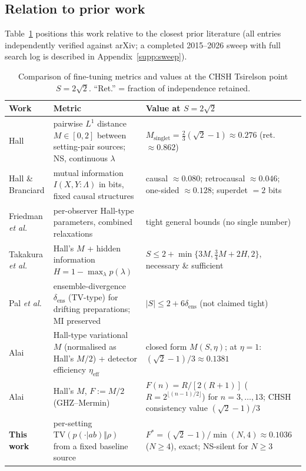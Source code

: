 \documentclass[aps,pra,reprint,superscriptaddress,floatfix]{revtex4-2}
\newcommand{\TV}{\mathrm{TV}}
\begin{document}
\subsection{Relation to prior work}
\label{sec:related}

Table~\ref{tab:lit} positions this work relative to the closest prior
literature (all entries independently verified against arXiv; a completed
2015--2026 sweep with full search log is described in Appendix~\ref{supp:sweep}).

\begin{table}[!htbp]
\caption{Comparison of fine-tuning metrics and values at the CHSH Tsirelson
point $S=2\sqrt2$. ``Ret.'' = fraction of independence retained.}
\label{tab:lit}
\small
\begin{tabular}{@{}>{\raggedright\arraybackslash}p{2.6cm}>{\raggedright\arraybackslash}p{2.9cm}>{\raggedright\arraybackslash}p{2.8cm}@{}}
\toprule
Work & Metric & Value at $S=2\sqrt2$ \\ \midrule
Hall \cite{hall2010}
& pairwise $L^1$ distance $M\in[0,2]$ between setting-pair sources; NS, continuous $\lambda$
& $M_{\mathrm{singlet}}=\tfrac{2}{3}(\sqrt2-1)\approx0.276$ (ret.\ $\approx0.862$) \\ \addlinespace
Hall \& Branciard \cite{hallbranciard2020}
& mutual information $I(X,Y:\Lambda)$ in bits, fixed causal structures
& causal $\approx0.080$; retrocausal $\approx0.046$; one-sided $\approx0.128$; superdet $=2$ bits \\ \addlinespace
Friedman \emph{et al.} \cite{fghk2019}
& per-observer Hall-type parameters, combined relaxations
& tight general bounds (no single number) \\ \addlinespace
Takakura \emph{et al.} \cite{takakura2022}
& Hall's $M$ + hidden information $H=1-\max_\lambda p(\lambda)$
& $S\le 2+\min\{3M,\tfrac34 M+2H,2\}$, necessary \& sufficient \\ \addlinespace
Pal \emph{et al.} \cite{pal2026}
& ensemble-divergence $\delta_{\mathrm{ens}}$ (TV-type) for drifting preparations; MI preserved
& $|S|\le 2+6\delta_{\mathrm{ens}}$ (not claimed tight) \\ \addlinespace
Alai \cite{alai2026a}
& Hall-type variational $M$ (normalised as Hall's $M/2$) + detector efficiency $\eta_{\mathrm{eff}}$
& closed form $M(S,\eta)$; at $\eta=1$: $(\sqrt2-1)/3\approx0.1381$ \\ \addlinespace
Alai \cite{alai2026b}
& Hall's $M$, $F:=M/2$ (GHZ--Mermin)
& $F(n)=R/[2(R+1)]$ ($R=2^{\lfloor(n-1)/2\rfloor}$) for $n=3,\dots,13$; CHSH consistency value $(\sqrt2-1)/3$ \\ \addlinespace
\textbf{This work}
& per-setting $\TV(p(\cdot|ab)\Vert\rho)$ from a fixed baseline source
& $F^*=(\sqrt2-1)/\min(N,4)\approx0.1036$ ($N\ge4$), exact; NS-silent for $N\ge3$ \\ \bottomrule
\end{tabular}
\end{table}
\end{document}

